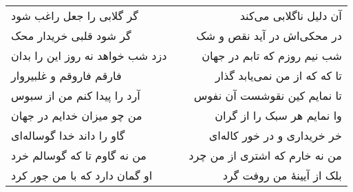 \begin{center}
\begin{longtable}{l p{0.5cm} r}
گر گلابی را جعل راغب شود
&&
آن دلیل ناگلابی می‌کند
\\
گر شود قلبی خریدار محک
&&
در محکی‌اش در آید نقص و شک
\\
دزد شب خواهد نه روز این را بدان
&&
شب نیم روزم که تابم در جهان
\\
فارقم فاروقم و غلبیروار
&&
تا که که از من نمی‌یابد گذار
\\
آرد را پیدا کنم من از سبوس
&&
تا نمایم کین نقوشست آن نفوس
\\
من چو میزان خدایم در جهان
&&
وا نمایم هر سبک را از گران
\\
گاو را داند خدا گوساله‌ای
&&
خر خریداری و در خور کاله‌ای
\\
من نه گاوم تا که گوسالم خرد
&&
من نه خارم که اشتری از من چرد
\\
او گمان دارد که با من جور کرد
&&
بلک از آیینهٔ من روفت گرد
\\
\end{longtable}
\end{center}
